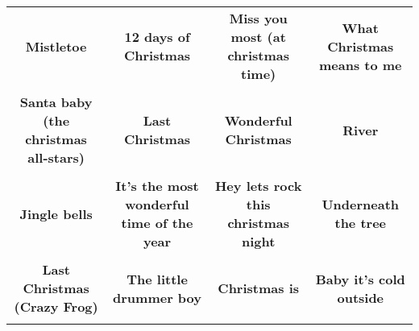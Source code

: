 \documentclass[12pt]{article} \usepackage{eso-pic, graphicx}
\newcommand{\background}[1]{%
\AddToShipoutPictureBG*{\texttt{[image: \#1]}}
}
\begin{document}
\tabcolsep=30.2pt \renewcommand{\arraystretch}{4.5}   \vspace*{4.3cm} \begin{center}  \begin{tabular}{c c c c}
\parbox{3cm}{\centering \textbf{Mistletoe}}& 
\parbox{3cm}{\centering \textbf{12 days of Christmas}}& 
\parbox{3cm}{\centering \textbf{Miss you most (at christmas time)}}& 
\parbox{3cm}{\centering \textbf{What Christmas means to me}}\\ \\ 
\parbox{3cm}{\centering \textbf{Santa baby (the christmas all-stars)}}& 
\parbox{3cm}{\centering \textbf{Last Christmas}}& 
\parbox{3cm}{\centering \textbf{Wonderful Christmas}}& 
\parbox{3cm}{\centering \textbf{River}}\\ \\ 
\parbox{3cm}{\centering \textbf{Jingle bells}}& 
\parbox{3cm}{\centering \textbf{It’s the most wonderful time of the year}}& 
\parbox{3cm}{\centering \textbf{Hey lets rock this christmas night}}& 
\parbox{3cm}{\centering \textbf{Underneath the tree}}\\ \\ 
\parbox{3cm}{\centering \textbf{Last Christmas (Crazy Frog)}}& 
\parbox{3cm}{\centering \textbf{The little drummer boy}}& 
\parbox{3cm}{\centering \textbf{Christmas is}}& 
\parbox{3cm}{\centering \textbf{Baby it’s cold outside}}\\ \\ 
\end{tabular} \background{discobingo.pdf} \end{center} 
\end{document}
